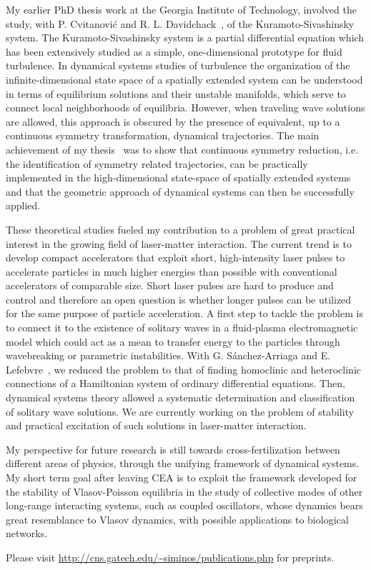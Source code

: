 \documentclass[a4paper,10pt]{article}
\begin{document}
My earlier PhD thesis work at the Georgia Institute of Technology,
involved the study, with P. Cvitanovi\'c and R. L. Davidchack~\cite{SCD07}, 
of the Kuramoto-Sivashinsky system. 
The Kuramoto-Sivashinsky system is a partial differential equation which
has been extensively studied as a simple, 
one-dimensional prototype for fluid turbulence. In dynamical systems 
studies of turbulence the organization of the
infinite-dimensional state space of a spatially extended system
can be understood in terms of equilibrium solutions
and their unstable manifolds, which serve to connect local neighborhoods
of equilibria. However, when traveling wave solutions are
allowed, this approach is obscured by the presence of equivalent, up to 
a continuous symmetry transformation, dynamical trajectories. 
The main achievement of my thesis~\cite{SiminosThesis,SiCvi10} 
was to show that continuous symmetry
reduction, i.e. the identification of symmetry related trajectories, 
can be practically implemented in the high-dimensional state-space 
of spatially extended systems and that the geometric approach of dynamical
systems can then be successfully applied.

These theoretical studies fueled my contribution to a problem of great
practical interest in the growing field of laser-matter interaction. 
The current trend is to develop compact accelerators that
exploit short, high-intensity laser pulses to accelerate particles
in much higher energies than possible with conventional accelerators 
of comparable size. Short laser pulses are hard to produce and control and
therefore an open question is whether longer pulses can be utilized for
the same purpose of particle acceleration. A first step to tackle the
problem is to connect it to the existence of solitary waves 
in a fluid-plasma electromagnetic model which could act as a mean to transfer   
energy to the particles through wavebreaking or parametric instabilities.
With G. S\'anchez-Arriaga and E. Lefebvre~\cite{SSL10}, we reduced
the problem to that of finding homoclinic and heteroclinic connections
of a Hamiltonian system of ordinary differential equations. Then,
dynamical systems theory allowed a systematic determination and classification
of solitary wave solutions. We are currently working on the problem
of stability and practical excitation of such solutions in laser-matter
interaction.

My perspective for future research is still towards cross-fertilization
between different areas of physics, through the unifying framework of
dynamical systems. My short term goal after leaving CEA is to exploit
the framework developed for the stability of Vlasov-Poisson equilibria 
in the study of collective modes of other long-range interacting systems, 
such as coupled oscillators, whose dynamics bears great resemblance
to Vlasov dynamics, with possible applications to biological networks.




Please visit \href{http://cns.gatech.edu/~siminos/publications.php}{\url{http://cns.gatech.edu/~siminos/publications.php}}
for preprints.
\end{document}

